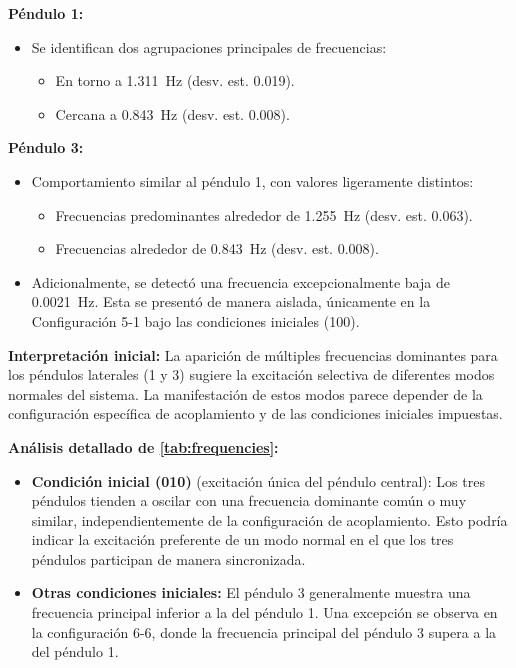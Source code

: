 \textbf{P\'endulo 1:}
\begin{itemize}
  \item Se identifican dos agrupaciones principales de frecuencias:
    \begin{itemize}
      \item En torno a \qty{1.311}{\Hz} (desv. est. \num{0.019}).
      \item Cercana a \qty{0.843}{\Hz} (desv. est. \num{0.008}).
    \end{itemize}
\end{itemize}

\textbf{P\'endulo 3:}
\begin{itemize}
  \item Comportamiento similar al p\'endulo 1, con valores ligeramente
    distintos:
    \begin{itemize}
      \item Frecuencias predominantes alrededor de \qty{1.255}{\Hz}
        (desv. est. \num{0.063}).
      \item Frecuencias alrededor de \qty{0.843}{\Hz} (desv. est. \num{0.008}).
    \end{itemize}
  \item Adicionalmente, se detect\'o una frecuencia excepcionalmente baja de
    \qty{0.0021}{\Hz}. Esta se present\'o de manera aislada,
    \'unicamente en la Configuraci\'on 5-1 bajo las condiciones
    iniciales (100).
\end{itemize}

\textbf{Interpretaci\'on inicial:} La aparici\'on de m\'ultiples frecuencias
dominantes para los p\'endulos laterales (1 y 3) sugiere la excitaci\'on
selectiva de diferentes modos normales del sistema. La manifestaci\'on de
estos modos parece depender de la configuraci\'on espec\'ifica de
acoplamiento y de las condiciones iniciales impuestas.

\textbf{An\'alisis detallado de \cref{tab:frequencies}:}
\begin{itemize}
  \item \textbf{Condici\'on inicial (010)} (excitaci\'on \'unica del p\'endulo
    central): Los tres p\'endulos tienden a oscilar con una frecuencia
    dominante com\'un o muy similar, independientemente de la
    configuraci\'on de acoplamiento. Esto podr\'ia indicar la
    excitaci\'on preferente de un modo normal en el que los tres
    p\'endulos participan de manera sincronizada.
  \item \textbf{Otras condiciones iniciales:} El p\'endulo 3 generalmente
    muestra una frecuencia principal inferior a la del p\'endulo 1.
    Una excepci\'on se observa en la configuraci\'on 6-6, donde la
    frecuencia principal del p\'endulo 3 supera a la del p\'endulo 1.
\end{itemize}

